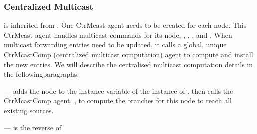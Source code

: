 \subsubsection{Centralized Multicast}
\begin{list}{}{}
\item
{} is inherited from .
One CtrMcast agent needs to be created for each node.
This CtrMcast agent handles multicast commands for its node,
\eg, , 
, and .
When multicast forwarding entries need to be updated, it calls a 
global, unique CtrMcastComp
(centralized multicast computation) agent to compute and install the new
entries.
We will describe the centralised multicast computation details
in the followingparagraphs.

--- 
 adds the node to the instance variable
 of the instance of .
then calls the CtrMcastComp agent, , to compute the branches
for this node to reach all existing sources.

---
 is the reverse of 


\end{list}
